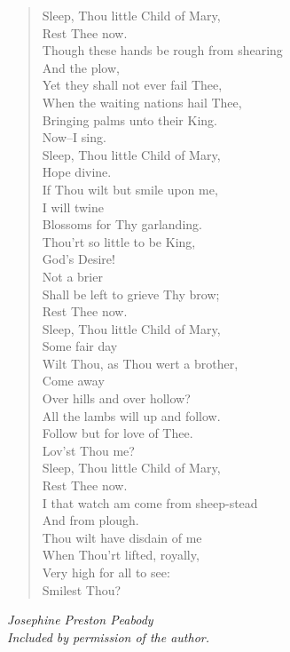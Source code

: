 
\begin{verse}
Sleep, Thou little Child of Mary,\\
\hspace*{2em}Rest Thee now.\\
Though these hands be rough from shearing\\
\hspace*{2em}And the plow,\\
Yet they shall not ever fail Thee,\\
When the waiting nations hail Thee,\\
Bringing palms unto their King.\\
\hspace*{2em}Now--I sing.\\[0.7em]

Sleep, Thou little Child of Mary,\\
\hspace*{2em}Hope divine.\\
If Thou wilt but smile upon me,\\
\hspace*{2em}I will twine\\
Blossoms for Thy garlanding.\\
Thou'rt so little to be King,\\
\hspace*{2em}God's Desire!\\
\hspace*{2em}Not a brier\\
Shall be left to grieve Thy brow;\\
\hspace*{2em}Rest Thee now.\\[0.7em]

Sleep, Thou little Child of Mary,\\
\hspace*{2em}Some fair day\\
Wilt Thou, as Thou wert a brother,\\
\hspace*{2em}Come away\\
Over hills and over hollow?\\
All the lambs will up and follow.\\
Follow but for love of Thee.\\
\hspace*{2em}Lov'st Thou me?\\[0.7em]

Sleep, Thou little Child of Mary,\\
\hspace*{2em}Rest Thee now.\\
I that watch am come from sheep-stead\\
\hspace*{2em}And from plough.\\
Thou wilt have disdain of me\\
When Thou'rt lifted, royally,\\
Very high for all to see:\\
\hspace*{2em}Smilest Thou?%
\end{verse}

\vspace{0.5\baselineskip}
\noindent\textit{Josephine Preston Peabody}\\
\noindent\textit{Included by permission of the author.}

\newpage
